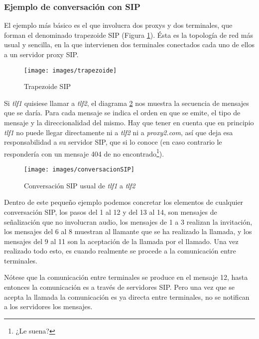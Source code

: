 \subsubsection{Ejemplo de conversación con SIP}
\label{sec:ejemplo}

El ejemplo más básico es el que involucra dos proxys y dos terminales, que forman el denominado trapezoide SIP (Figura \ref{fig:trapezo-sip}). Ésta es la topología de red más usual y sencilla, en la que intervienen dos terminales conectados cada uno de ellos a un servidor proxy SIP.

\begin{figure}[b]
  \centering
  \texttt{[image: images/trapezoide]}
  \caption{Trapezoide SIP}
\label{fig:trapezo-sip}
\end{figure}

Si \emph{tlf1} quisiese llamar a \emph{tlf2}, el diagrama \ref{fig:conv-sip} nos muestra la secuencia de mensajes que se daría. Para cada mensaje se indica el orden en que se emite, el tipo de mensaje y la direccionalidad del mismo. Hay que tener en cuenta que en principio \emph{tlf1} no puede llegar directamente ni a \emph{tlf2} ni a \emph{proxy2.com}, así que deja esa responsabilidad a su servidor SIP, que si lo conoce (en caso contrario le respondería con un mensaje 404 de no encontrado\footnote{¿Le suena?}).

\begin{figure}[!h]
  \centering
 \label{fig:conv-sip} 
 \texttt{[image: images/conversacionSIP]}
  \caption{Conversación SIP usual de \emph{tlf1} a \emph{tlf2}}

\end{figure}

Dentro de este pequeño ejemplo podemos concretar los elementos de cualquier conversación SIP, los pasos del 1 al 12 y del 13 al 14, son mensajes de señalización que no involucran audio, los mensajes de 1 a 3 realizan la invitación, los mensajes del 6 al 8 muestran al llamante que se ha realizado la llamada, y los mensajes del 9 al 11 son la aceptación de la llamada por el llamado. Una vez realizado todo esto, es cuando realmente se procede a la comunicación entre terminales.

Nótese que la comunicación entre terminales se produce en el mensaje 12, hasta entonces la comunicación es a través de servidores SIP. Pero una vez que se acepta la llamada la comunicación es ya directa entre terminales, no se notifican a los servidores los mensajes.

